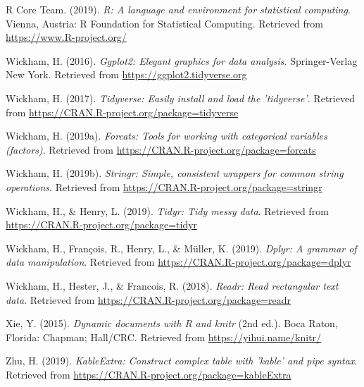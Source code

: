 \documentclass[man, fleqn, noextraspace,floatsintext]{apa6}
\begin{document}
\hypertarget{ref-R-base}{}
R Core Team. (2019). \emph{R: A language and environment for statistical
computing}. Vienna, Austria: R Foundation for Statistical Computing.
Retrieved from \url{https://www.R-project.org/}

\hypertarget{ref-R-ggplot2}{}
Wickham, H. (2016). \emph{Ggplot2: Elegant graphics for data analysis}.
Springer-Verlag New York. Retrieved from
\url{https://ggplot2.tidyverse.org}

\hypertarget{ref-R-tidyverse}{}
Wickham, H. (2017). \emph{Tidyverse: Easily install and load the
'tidyverse'}. Retrieved from
\url{https://CRAN.R-project.org/package=tidyverse}

\hypertarget{ref-R-forcats}{}
Wickham, H. (2019a). \emph{Forcats: Tools for working with categorical
variables (factors)}. Retrieved from
\url{https://CRAN.R-project.org/package=forcats}

\hypertarget{ref-R-stringr}{}
Wickham, H. (2019b). \emph{Stringr: Simple, consistent wrappers for
common string operations}. Retrieved from
\url{https://CRAN.R-project.org/package=stringr}

\hypertarget{ref-R-tidyr}{}
Wickham, H., \& Henry, L. (2019). \emph{Tidyr: Tidy messy data}.
Retrieved from \url{https://CRAN.R-project.org/package=tidyr}

\hypertarget{ref-R-dplyr}{}
Wickham, H., François, R., Henry, L., \& Müller, K. (2019). \emph{Dplyr:
A grammar of data manipulation}. Retrieved from
\url{https://CRAN.R-project.org/package=dplyr}

\hypertarget{ref-R-readr}{}
Wickham, H., Hester, J., \& Francois, R. (2018). \emph{Readr: Read
rectangular text data}. Retrieved from
\url{https://CRAN.R-project.org/package=readr}

\hypertarget{ref-R-knitr}{}
Xie, Y. (2015). \emph{Dynamic documents with R and knitr} (2nd ed.).
Boca Raton, Florida: Chapman; Hall/CRC. Retrieved from
\url{https://yihui.name/knitr/}

\hypertarget{ref-R-kableExtra}{}
Zhu, H. (2019). \emph{KableExtra: Construct complex table with 'kable'
and pipe syntax}. Retrieved from
\url{https://CRAN.R-project.org/package=kableExtra}

\endgroup

\clearpage

\renewcommand{\listfigurename}{Figure captions}

\listoffigures
\end{document}
